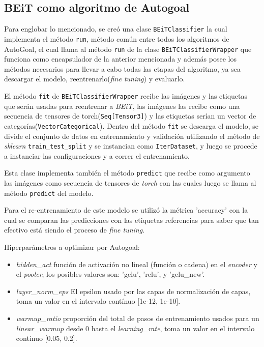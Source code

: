 \subsection{BEiT como algoritmo de Autogoal}
Para englobar lo mencionado, se creó una clase \texttt{BEiTClassifier} la cual implementa el método \texttt{run}, método común entre todos los algoritmos de AutoGoal, el cual llama al método \texttt{run} de la clase \texttt{BEiTClassifierWrapper} que funciona como encapsulador de la anterior mencionada y además posee los métodos necesarios para llevar a cabo todas las etapas del algoritmo, ya sea descargar el modelo, reentrenarlo(\textit{fine tuning}) y evaluarlo.

El método \texttt{fit} de \texttt{BEiTClassifierWrapper}  recibe las imágenes y las etiquetas que serán usadas para reentrenar a \textit{BEiT}, las imágenes las recibe como una secuencia de tensores de torch(\texttt{Seq[Tensor3]}) y las etiquetas serían un vector de categorías(\texttt{VectorCategorical}). Dentro del método \texttt{fit} se descarga el modelo, se divide el conjunto de datos en entrenamiento y validación utilizando el método de \textit{sklearn} \texttt{train\_test\_split} y se instancian como \texttt{IterDataset}, y luego se procede a instanciar las configuraciones y a correr el entrenamiento.

Esta clase implementa también el método \texttt{predict} que recibe como argumento las imágenes como secuencia de tensores de \textit{torch} con las cuales luego se llama al método \texttt{predict} del modelo.

Para el re-entrenamiento de este modelo se utilizó la métrica 'accuracy' con la cual se comparan las predicciones con las etiquetas referencias para saber que tan efectivo está siendo el proceso de \textit{fine tuning}.

Hiperparámetros a optimizar por Autogoal:
\begin{itemize}
    \item \textit{hidden\_act} función de activación no lineal (función o cadena) en el \textit{encoder} y el \textit{pooler}, los posibles valores son: 'gelu', 'relu', y 'gelu\_new'.
    \item \textit{layer\_norm\_eps} El epsilon usado por las capas de normalización de capas, toma un valor en el intervalo contínuo [1e-12, 1e-10].
    \item \textit{warmup\_ratio} proporción del total de pasos de entrenamiento usados para un \textit{linear\_warmup} desde 0 hasta el \textit{learning\_rate}, toma un valor en el intervalo contínuo [0.05, 0.2].
\end{itemize}

